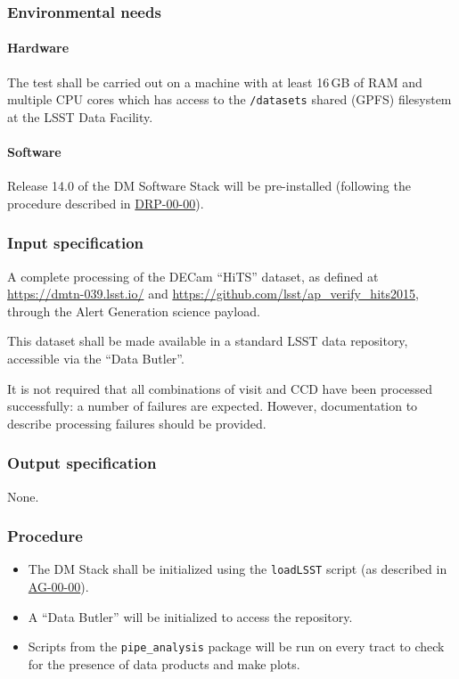 \subsubsection{Environmental needs}

\paragraph{Hardware}

The test shall be carried out on a machine with at least 16\,GB of RAM and
multiple CPU cores which has access to the \texttt{/datasets} shared (GPFS)
filesystem at the LSST Data Facility.

\paragraph{Software}

Release 14.0 of the DM Software Stack will be pre-installed (following the
procedure described in \hyperref[drp-00-00]{DRP-00-00}).

\subsubsection{Input specification}

A complete processing of the DECam ``HiTS'' dataset, as defined at
\url{https://dmtn-039.lsst.io/} and
\url{https://github.com/lsst/ap_verify_hits2015}, through the Alert
Generation science payload.

This dataset shall be made available in a standard LSST data repository,
accessible via the ``Data Butler''.

It is not required that all combinations of visit and CCD have been processed
successfully: a number of failures are expected. However, documentation to
describe processing failures should be provided.

\subsubsection{Output specification}

None.

\subsubsection{Procedure}

\begin{itemize}

  \item{The DM Stack shall be initialized using the \texttt{loadLSST} script
  (as described in \hyperref[ag-00-00]{AG-00-00}).}

  \item{A ``Data Butler'' will be initialized to access the repository.}

  \item{Scripts from the \texttt{pipe\_analysis} package will be run on
	  every tract to check for the presence of data products and make
		plots.}

\end{itemize}
